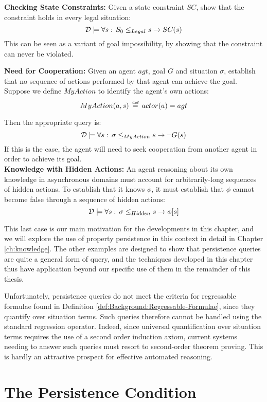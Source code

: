 \textbf{Checking State Constraints:} Given a state constraint $SC$,
show that the constraint holds in every legal situation:\[
\mathcal{D}\models\forall s:\, S_{0}\leq_{Legal}s\rightarrow SC(s)\]
 This can be seen as a variant of goal impossibility, by showing that
the constraint can never be violated.\newpage{}

\textbf{Need for Cooperation:} Given an agent $agt$, goal $G$ and
situation $\sigma$, establish that no sequence of actions performed
by that agent can achieve the goal. Suppose we define $MyAction$
to identify the agent's own actions:\[
MyAction(a,s)\,\stackrel{\mbox{\tiny def}}{=}\, actor(a)=agt\]


Then the appropriate query is:\[
\mathcal{D}\models\forall s:\,\sigma\leq_{MyAction}s\rightarrow\neg G(s)\]
 If this is the case, the agent will need to seek cooperation from
another agent in order to achieve its goal.\\


\textbf{Knowledge with Hidden Actions:} An agent reasoning about its
own knowledge in asynchronous domains must account for arbitrarily-long
sequences of hidden actions. To establish that it knows $\phi$, it
must establish that $\phi$ cannot become false through a sequence
of hidden actions:\[
\mathcal{D}\models\forall s:\,\sigma\leq_{Hidden}s\rightarrow\phi[s]\]


This last case is our main motivation for the developments in this
chapter, and we will explore the use of property persistence in this
context in detail in Chapter \ref{ch:knowledge}. The other examples
are designed to show that persistence queries are quite a general
form of query, and the techniques developed in this chapter thus have
application beyond our specific use of them in the remainder of this
thesis.

Unfortunately, persistence queries do not meet the criteria for regressable
formulae found in Definition \ref{def:Background:Regressable-Formulae},
since they quantify over situation terms. Such queries therefore cannot
be handled using the standard regression operator. Indeed, since universal
quantification over situation terms requires the use of a second order
induction axiom, current systems needing to answer such queries must
resort to second-order theorem proving. This is hardly an attractive
prospect for effective automated reasoning.


\section{The Persistence Condition\label{sec:Persistence:Condition}}

